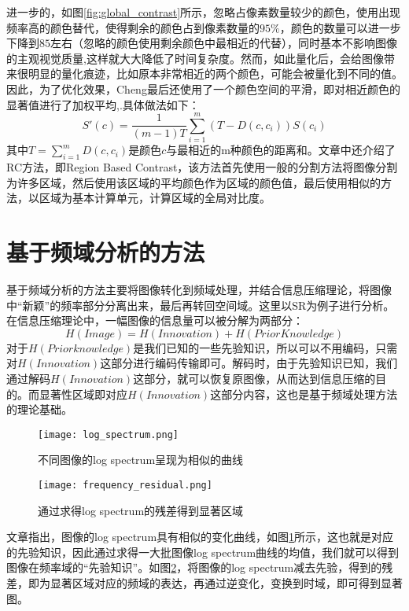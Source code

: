 进一步的，如图\ref{fig:global_contrast}所示，忽略占像素数量较少的颜色，使用出现频率高的颜色替代，使得剩余的颜色占到像素数量的$95\%$，颜色的数量可以进一步下降到$85$左右（忽略的颜色使用剩余颜色中最相近的代替），同时基本不影响图像的主观视觉质量\cite{cheng2011global},这样就大大降低了时间复杂度。然而，如此量化后，会给图像带来很明显的量化痕迹，比如原本非常相近的两个颜色，可能会被量化到不同的值。因此，为了优化效果，Cheng最后还使用了一个颜色空间的平滑，即对相近颜色的显著值进行了加权平均,.具体做法如下：
\begin{equation}
S'(c) = \frac{1}{(m-1)T}\sum_{i=1}^{m}(T-D(c,c_i))S(c_i)
\end{equation}
其中$T=\sum_{i=1}^m D(c,c_i)$是颜色$c$与最相近的m种颜色的距离和。文章中还介绍了RC方法，即Region Based Contrast，该方法首先使用一般的分割方法将图像分割为许多区域，然后使用该区域的平均颜色作为区域的颜色值，最后使用相似的方法，以区域为基本计算单元，计算区域的全局对比度。

\section{基于频域分析的方法}
基于频域分析的方法主要将图像转化到频域处理，并结合信息压缩理论，将图像中“新颖”的频率部分分离出来，最后再转回空间域。这里以SR\cite{hou2007saliency}为例子进行分析。在信息压缩理论中，一幅图像的信息量可以被分解为两部分：
\begin{equation}
H(Image)=H(Innovation)+H(Prior Knowledge)
\end{equation}
对于$H(Prior knowledge)$是我们已知的一些先验知识，所以可以不用编码，只需对$H(Innovation)$这部分进行编码传输即可。解码时，由于先验知识已知，我们通过解码$H(Innovation)$这部分，就可以恢复原图像，从而达到信息压缩的目的。而显著性区域即对应$H(Innovation)$这部分内容，这也是基于频域处理方法的理论基础。

\begin{figure}[h]
\centering
\texttt{[image: log\_spectrum.png]}
\caption{不同图像的log spectrum呈现为相似的曲线}\label{fig:log_spectrum}
\end{figure}

\begin{figure}[t]
\centering
\texttt{[image: frequency\_residual.png]}
\caption{通过求得log spectrum的残差得到显著区域}\label{fig:frequency_residual}
\end{figure}

文章指出，图像的log spectrum具有相似的变化曲线，如图\ref{fig:log_spectrum}所示，这也就是对应的先验知识，因此通过求得一大批图像log spectrum曲线的均值，我们就可以得到图像在频率域的“先验知识”。如图\ref{fig:frequency_residual}，将图像的log spectrum减去先验，得到的残差，即为显著区域对应的频域的表达，再通过逆变化，变换到时域，即可得到显著图。

